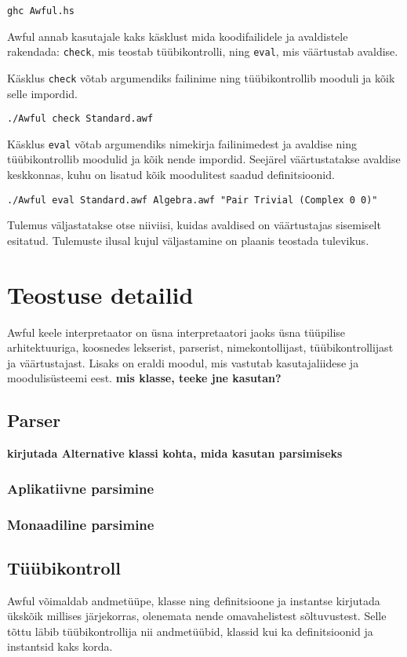\documentclass[12pt]{article}
\newcommand\peatykk[1]{
  \clearpage
  \section{#1}}
\newcommand\markus[1]{\textcolor{roheline}{\textbf{#1}}}
\begin{document}
      \begin{verbatim}ghc Awful.hs\end{verbatim}

      Awful annab kasutajale kaks käsklust mida koodifailidele ja avaldistele rakendada: \verb!check!, mis teostab tüübikontrolli, ning \verb!eval!, mis väärtustab avaldise.

      Käsklus \verb!check! võtab argumendiks failinime ning tüübikontrollib mooduli ja kõik selle impordid.

      \begin{verbatim}./Awful check Standard.awf\end{verbatim}

      Käsklus \verb!eval! võtab argumendiks nimekirja failinimedest ja avaldise ning tüübikontrollib moodulid ja kõik nende impordid. Seejärel väärtustatakse avaldise keskkonnas, kuhu on lisatud kõik moodulitest saadud definitsioonid.

      \begin{verbatim}./Awful eval Standard.awf Algebra.awf "Pair Trivial (Complex 0 0)"\end{verbatim}

      Tulemus väljastatakse otse niiviisi, kuidas avaldised on väärtustajas sisemiselt esitatud. Tulemuste ilusal kujul väljastamine on plaanis teostada tulevikus.
  \peatykk{Teostuse detailid}
    Awful keele interpretaator on üsna interpretaatori jaoks üsna tüüpilise arhitektuuriga, koosnedes lekserist, parserist, nimekontollijast, tüübikontrollijast ja väärtustajast. Lisaks on eraldi moodul, mis vastutab kasutajaliidese ja moodulisüsteemi eest. \markus{mis klasse, teeke jne kasutan?}
    \subsection{Parser}
      \markus{kirjutada Alternative klassi kohta, mida kasutan parsimiseks}
      \subsubsection{Aplikatiivne parsimine}
        
      \subsubsection{Monaadiline parsimine}
        
    \subsection{Tüübikontroll}
      Awful võimaldab andmetüüpe, klasse ning definitsioone ja instantse kirjutada ükskõik millises järjekorras, olenemata nende omavahelistest sõltuvustest. Selle tõttu läbib tüübikontrollija nii andmetüübid, klassid kui ka definitsioonid ja instantsid kaks korda.
\end{document}
